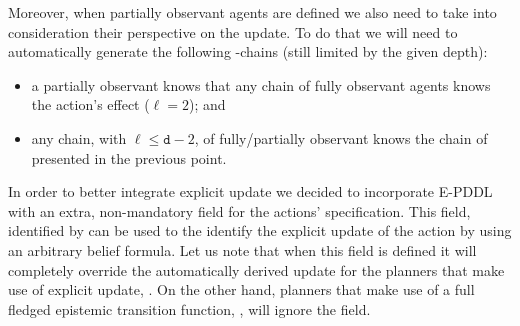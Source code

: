 \noindent Moreover, when partially observant agents are defined we also need to take into consideration their perspective on the \knobel update.
To do that we will need to automatically generate the following \knobel-chains (still limited by the given depth):
\begin{itemize}
    \item a partially observant knows that any chain of fully observant agents knows the action's effect ($\ell = 2$); and
    \item any chain, with $\ell \leq \mathtt{d}-2$, of fully/partially observant knows the chain of \knobel presented in the previous point.
\end{itemize}
In order to better integrate explicit \knobel update we decided to incorporate E-PDDL with an extra, non-mandatory field for the actions' specification.
This field, identified by  can be used to the identify the explicit \knobel update of the action by using an arbitrary belief formula.
Let us note that when this field is defined it will completely override the automatically derived \knobel update for the planners that make use of explicit \knobel update, \eg \rpmep.
On the other hand, planners that make use of a full fledged epistemic transition function, \eg \EFP, will ignore the  field.
